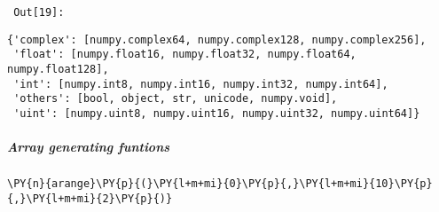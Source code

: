         {\par%
        \vspace{-1\smallerfontscale}%
        \noindent%
        \begin{minipage}{\cellleftmargin}%
    \hfill%
    {\smaller%
    \tt%
    \color{nbframe-out-prompt}%
    Out[19]:}%
    \hspace{\inputpadding}%
    \hspace{0em}%
    \hspace{3pt}%
    \end{minipage}%
        }%
    \begin{addmargin}[\cellleftmargin]{0em}%
    {\smaller%
    \vspace{-1\smallerfontscale}%
    
    
    
    \begin{verbatim}
{'complex': [numpy.complex64, numpy.complex128, numpy.complex256],
 'float': [numpy.float16, numpy.float32, numpy.float64, numpy.float128],
 'int': [numpy.int8, numpy.int16, numpy.int32, numpy.int64],
 'others': [bool, object, str, unicode, numpy.void],
 'uint': [numpy.uint8, numpy.uint16, numpy.uint32, numpy.uint64]}
    \end{verbatim}

    
}%
    \end{addmargin}%

    \subparagraph{Array generating funtions}



{\par%
\vspace{-1\baselineskip}%
}%
\begin{notebookcell}[20]%
\begin{addmargin}[\cellleftmargin]{0em}%
{\smaller%
\par%
%
\vspace{-1\smallerfontscale}%
\begin{Verbatim}[commandchars=\\\{\}]
\PY{n}{arange}\PY{p}{(}\PY{l+m+mi}{0}\PY{p}{,}\PY{l+m+mi}{10}\PY{p}{,}\PY{l+m+mi}{2}\PY{p}{)}
\end{Verbatim}
%
\par%
\vspace{-1\smallerfontscale}}%
\end{addmargin}
\end{notebookcell}

\par\vspace{1\smallerfontscale}%
    
